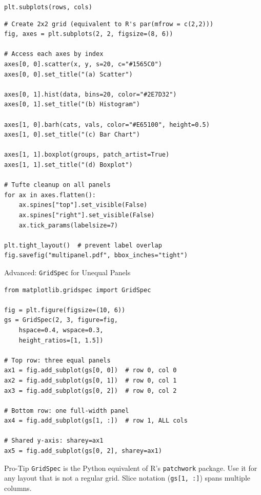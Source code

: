 \documentclass[10pt]{beamer}
\begin{document}
\begin{frame}[fragile]{\texttt{plt.subplots(rows, cols)}}
\begin{lstlisting}[style=pythonstyle]
# Create 2x2 grid (equivalent to R's par(mfrow = c(2,2)))
fig, axes = plt.subplots(2, 2, figsize=(8, 6))

# Access each axes by index
axes[0, 0].scatter(x, y, s=20, c="#1565C0")
axes[0, 0].set_title("(a) Scatter")

axes[0, 1].hist(data, bins=20, color="#2E7D32")
axes[0, 1].set_title("(b) Histogram")

axes[1, 0].barh(cats, vals, color="#E65100", height=0.5)
axes[1, 0].set_title("(c) Bar Chart")

axes[1, 1].boxplot(groups, patch_artist=True)
axes[1, 1].set_title("(d) Boxplot")

# Tufte cleanup on all panels
for ax in axes.flatten():
    ax.spines["top"].set_visible(False)
    ax.spines["right"].set_visible(False)
    ax.tick_params(labelsize=7)

plt.tight_layout()  # prevent label overlap
fig.savefig("multipanel.pdf", bbox_inches="tight")
\end{lstlisting}
\end{frame}

\begin{frame}[fragile]{Advanced: \texttt{GridSpec} for Unequal Panels}
\begin{lstlisting}[style=pythonstyle]
from matplotlib.gridspec import GridSpec

fig = plt.figure(figsize=(10, 6))
gs = GridSpec(2, 3, figure=fig,
    hspace=0.4, wspace=0.3,
    height_ratios=[1, 1.5])

# Top row: three equal panels
ax1 = fig.add_subplot(gs[0, 0])  # row 0, col 0
ax2 = fig.add_subplot(gs[0, 1])  # row 0, col 1
ax3 = fig.add_subplot(gs[0, 2])  # row 0, col 2

# Bottom row: one full-width panel
ax4 = fig.add_subplot(gs[1, :])  # row 1, ALL cols

# Shared y-axis: sharey=ax1
ax5 = fig.add_subplot(gs[0, 2], sharey=ax1)
\end{lstlisting}

  \begin{alertblock}{Pro-Tip}
    \texttt{GridSpec} is the Python equivalent of R's \texttt{patchwork}
    package. Use it for any layout that is not a regular grid.
    Slice notation (\texttt{gs[1, :]}) spans multiple columns.
  \end{alertblock}
\end{frame}
\end{document}
